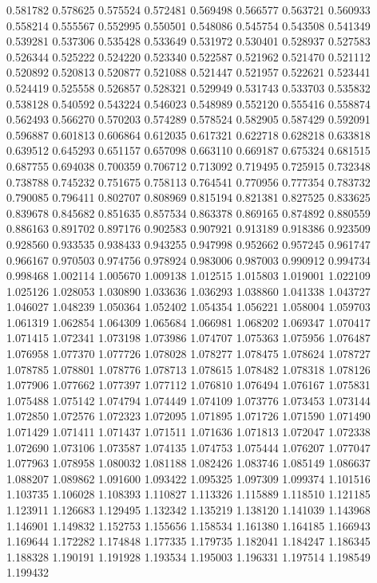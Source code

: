 0.581782
0.578625
0.575524
0.572481
0.569498
0.566577
0.563721
0.560933
0.558214
0.555567
0.552995
0.550501
0.548086
0.545754
0.543508
0.541349
0.539281
0.537306
0.535428
0.533649
0.531972
0.530401
0.528937
0.527583
0.526344
0.525222
0.524220
0.523340
0.522587
0.521962
0.521470
0.521112
0.520892
0.520813
0.520877
0.521088
0.521447
0.521957
0.522621
0.523441
0.524419
0.525558
0.526857
0.528321
0.529949
0.531743
0.533703
0.535832
0.538128
0.540592
0.543224
0.546023
0.548989
0.552120
0.555416
0.558874
0.562493
0.566270
0.570203
0.574289
0.578524
0.582905
0.587429
0.592091
0.596887
0.601813
0.606864
0.612035
0.617321
0.622718
0.628218
0.633818
0.639512
0.645293
0.651157
0.657098
0.663110
0.669187
0.675324
0.681515
0.687755
0.694038
0.700359
0.706712
0.713092
0.719495
0.725915
0.732348
0.738788
0.745232
0.751675
0.758113
0.764541
0.770956
0.777354
0.783732
0.790085
0.796411
0.802707
0.808969
0.815194
0.821381
0.827525
0.833625
0.839678
0.845682
0.851635
0.857534
0.863378
0.869165
0.874892
0.880559
0.886163
0.891702
0.897176
0.902583
0.907921
0.913189
0.918386
0.923509
0.928560
0.933535
0.938433
0.943255
0.947998
0.952662
0.957245
0.961747
0.966167
0.970503
0.974756
0.978924
0.983006
0.987003
0.990912
0.994734
0.998468
1.002114
1.005670
1.009138
1.012515
1.015803
1.019001
1.022109
1.025126
1.028053
1.030890
1.033636
1.036293
1.038860
1.041338
1.043727
1.046027
1.048239
1.050364
1.052402
1.054354
1.056221
1.058004
1.059703
1.061319
1.062854
1.064309
1.065684
1.066981
1.068202
1.069347
1.070417
1.071415
1.072341
1.073198
1.073986
1.074707
1.075363
1.075956
1.076487
1.076958
1.077370
1.077726
1.078028
1.078277
1.078475
1.078624
1.078727
1.078785
1.078801
1.078776
1.078713
1.078615
1.078482
1.078318
1.078126
1.077906
1.077662
1.077397
1.077112
1.076810
1.076494
1.076167
1.075831
1.075488
1.075142
1.074794
1.074449
1.074109
1.073776
1.073453
1.073144
1.072850
1.072576
1.072323
1.072095
1.071895
1.071726
1.071590
1.071490
1.071429
1.071411
1.071437
1.071511
1.071636
1.071813
1.072047
1.072338
1.072690
1.073106
1.073587
1.074135
1.074753
1.075444
1.076207
1.077047
1.077963
1.078958
1.080032
1.081188
1.082426
1.083746
1.085149
1.086637
1.088207
1.089862
1.091600
1.093422
1.095325
1.097309
1.099374
1.101516
1.103735
1.106028
1.108393
1.110827
1.113326
1.115889
1.118510
1.121185
1.123911
1.126683
1.129495
1.132342
1.135219
1.138120
1.141039
1.143968
1.146901
1.149832
1.152753
1.155656
1.158534
1.161380
1.164185
1.166943
1.169644
1.172282
1.174848
1.177335
1.179735
1.182041
1.184247
1.186345
1.188328
1.190191
1.191928
1.193534
1.195003
1.196331
1.197514
1.198549
1.199432
